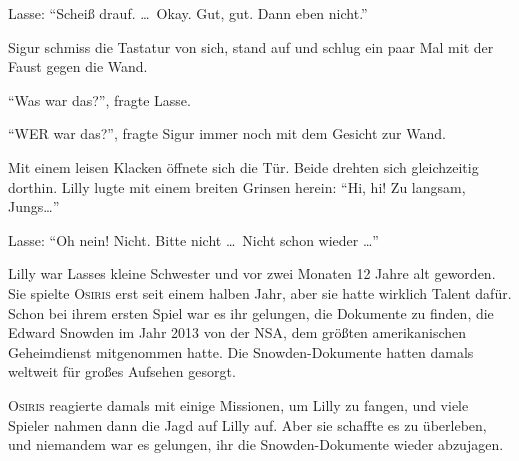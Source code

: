 Lasse: \enquote{Scheiß drauf.
\dots\  Okay.
Gut, gut.
Dann eben nicht.} 

Sigur schmiss die Tastatur von sich, stand auf und schlug ein paar Mal mit der Faust gegen die Wand.

\enquote{Was war das?}, fragte Lasse.

\enquote{WER war das?}, fragte Sigur immer noch mit dem Gesicht zur Wand.

Mit einem leisen Klacken öffnete sich die Tür.
Beide drehten sich gleichzeitig dorthin.
Lilly lugte mit einem breiten Grinsen herein: \enquote{Hi, hi! Zu langsam, Jungs\dots}

Lasse: \enquote{Oh nein! Nicht.
Bitte nicht \dots\  Nicht schon wieder \dots} 

Lilly war Lasses kleine Schwester und vor zwei Monaten 12 Jahre alt geworden.
Sie spielte \textsc{Osiris} erst seit einem halben Jahr, aber sie hatte wirklich Talent dafür.
Schon bei ihrem ersten Spiel war es ihr gelungen, die Dokumente zu finden, die Edward Snowden im Jahr 2013 von der NSA, dem größten amerikanischen Geheimdienst mitgenommen hatte.
Die Snowden-Dokumente hatten damals weltweit für großes Aufsehen gesorgt.

\textsc{Osiris} reagierte damals mit einige Missionen, um Lilly zu fangen, und viele Spieler nahmen dann die Jagd auf Lilly auf.
Aber sie schaffte es zu überleben, und niemandem war es gelungen, ihr die Snowden-Dokumente wieder abzujagen.

